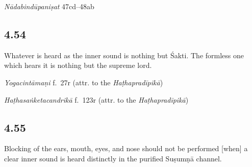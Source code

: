 \begin{ekdosis}
\begin{testimonia}[hp04_053]
\emph{Nādabindūpaniṣat} 47cd–48ab
\begin{versinnote}
\end{versinnote}
\end{testimonia}

\subsection*{4.54}
\begin{translation}[hp04_054]
Whatever is heard as the inner sound is nothing but Śakti. The formless one which hears it is nothing but the supreme lord.
\end{translation}



\begin{testimonia}[hp04_054]
\emph{Yogacintāmaṇi} f.~27r (attr. to the \emph{Haṭhapradīpikā})
\begin{versinnote}
\end{versinnote}

\emph{Haṭhasaṅketacandrikā} f.~123r (attr. to the \emph{Haṭhapradīpikā})
\begin{versinnote}
\end{versinnote}
\end{testimonia}


\subsection*{4.55}
\begin{translation}[hp04_055]
Blocking of the ears, mouth, eyes, and nose should not be performed [when] a clear inner sound is heard distinctly in the purified Suṣumṇā channel.
\end{translation}


\end{ekdosis}
